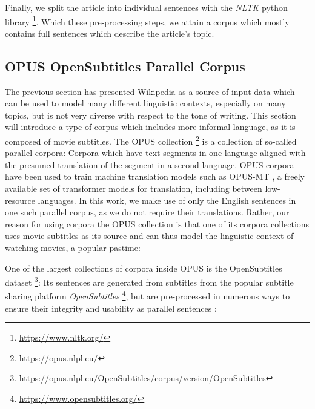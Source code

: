 Finally, we split the article into individual sentences with the \textit{NLTK} python library \footnote{\url{https://www.nltk.org/}}.
Which these pre-processing steps, we attain a corpus which mostly contains full	sentences which describe the article's topic.

\subsection{OPUS OpenSubtitles Parallel Corpus} \label{sec:opensubtitles}
The previous section has presented Wikipedia as a source of input data which can be used to model many different linguistic contexts, especially on many topics, but is not very diverse with respect to the tone of writing.
This section will introduce a type of corpus which includes more informal language, as it is composed of movie subtitles.
The OPUS collection \footnote{\url{https://opus.nlpl.eu/}} is a collection of so-called parallel corpora:
Corpora which have text segments in one language aligned with the presumed translation of the segment in a second language.
OPUS corpora have been used to train machine translation models such as OPUS-MT \cite{tiedemannOPUSMTbuildingOpenTranslation2020}, a freely available set of transformer models for translation, including between low-resource languages.
In this work, we make use of only the English sentences in one such parallel corpus, as we do not require their translations.
Rather, our reason for using corpora the OPUS collection is that one of its corpora collections uses movie subtitles as its source and can thus model the linguistic context of watching movies, a popular pastime:

One of the largest collections of corpora inside OPUS is the OpenSubtitles dataset \footnote{\url{https://opus.nlpl.eu/OpenSubtitles/corpus/version/OpenSubtitles}}:
Its sentences are generated from subtitles from the popular subtitle sharing platform \textit{OpenSubtitles} \footnote{\url{https://www.opensubtitles.org/} }, but are pre-processed in numerous ways to ensure their integrity and usability as parallel sentences \cite{lisonOpensubtitles2016ExtractingLarge2016}:

